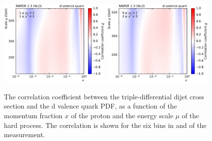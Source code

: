 \begin{figure}[htbp]
    \includegraphics[width=0.49\textwidth]{figures/pdf_constraints/corr_PTMAXEXPYS_YBYS_NLO_FINALBINS_NNPDF23_d_valence_quark_ys1_0yb1_0_cl.pdf}\hfill
    \includegraphics[width=0.49\textwidth]{figures/pdf_constraints/corr_PTMAXEXPYS_YBYS_NLO_FINALBINS_NNPDF23_d_valence_quark_ys2_0yb0_0_cl.pdf}\hfill
    \caption[Correlation between dijet cross section and d valence quark PDF]{
            The correlation coefficient between the triple-differential dijet cross
            section and the d valence quark PDF, as a function of the momentum fraction $x$ of the
            proton and the energy scale $\mu$ of the hard process. The correlation is shown
            for the six bins in \ystar and \yboost of the measurement.}
    \label{fig:pdfconstraints_d_valence_quark}
\end{figure}

